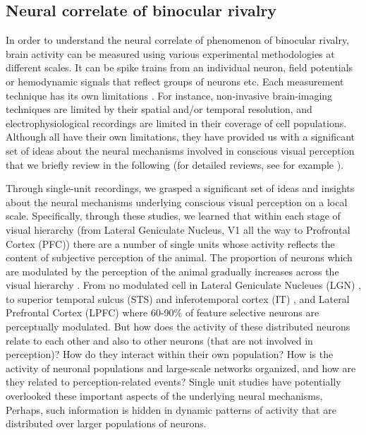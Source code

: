 \subsection{Neural correlate of binocular rivalry}
In order to understand the neural correlate of phenomenon of binocular rivalry,
brain activity can be measured using various experimental methodologies at different scales. 
It can be spike trains from an individual neuron, field potentials or hemodynamic signals that reflect groups of neurons etc. 
Each measurement technique has its own limitations \cite{logothetisWhatWeCan2008}. 
For instance, non-invasive brain-imaging techniques are limited by their spatial and/or temporal resolution,
and electrophysiological recordings are limited in their coverage of cell populations.
Although all have their own limitations, 
they have provided us with a significant set of ideas about the neural mechanisms involved in conscious visual perception
that we briefly review in the following
(for detailed reviews, see for example \citet{blakeVisualCompetition2002a,tononiNeuralCorrelatesConsciousness2008,panagiotaropoulosSubjectiveVisualPerception2014a,kochNeuralCorrelatesConsciousness2016}).


Through single-unit recordings, we grasped a significant set of ideas and insights about the neural mechanisms underlying conscious visual perception on a local scale.
Specifically, through these studies, we learned that within each stage of visual hierarchy (from Lateral Geniculate Nucleus, V1 all the way to Profrontal Cortex (PFC)) 
there are a number of single units whose activity reflects the content of subjective perception of the animal.
The proportion of neurons which are modulated by the perception of the animal gradually increases across the visual hierarchy \cite{panagiotaropoulosSubjectiveVisualPerception2014a}.
From no modulated cell in Lateral Geniculate Nucleues (LGN) \cite{lehkyNoBinocularRivalry1996},
to superior temporal sulcus (STS) and inferotemporal cortex (IT) \cite{sheinbergRoleTemporalCortical1997},
and Lateral Prefrontal Cortex (LPFC) \cite{panagiotaropoulosNeuronalDischargesGamma2012,kapoorDecodingInternallyGenerated2022}
where 60-90\% of feature selective neurons are perceptually modulated.
But how does the activity of these distributed neurons relate to each other and also to other neurons (that are not involved in perception)?
How do they interact within their own population?
How is the activity of neuronal populations and large-scale networks organized, and how  are they related to perception-related events?
Single unit studies have potentially overlooked these important aspects of the underlying neural mechanisms,
Perhaps, such information is hidden in dynamic patterns of activity that are distributed over larger populations of neurons.


